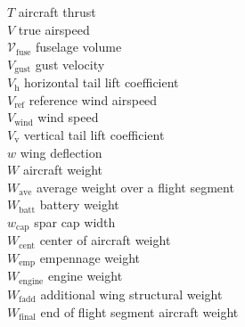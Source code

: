 \begin{multicols}{2}
\begin{tabbing}
$T$ \> aircraft thrust \\ %
$V$ \> true airspeed \\ %
$\mathcal{V}_{\text{fuse}}$ \>  fuselage volume \\ %
$V_{\text{gust}}$ \>  gust velocity \\ %
$V_{\text{h}}$ \> horizontal tail lift coefficient \\
$V_{\text{ref}}$ \>  reference wind airspeed \\ %
$V_{\text{wind}}$ \>  wind speed \\ %
$V_{\text{v}}$ \> vertical tail lift coefficient \\
$w$ \> wing deflection \\ %
$W$ \> aircraft weight \\ %
$W_{\text{ave}}$ \> average weight over a flight segment \\ %
$W_{\text{batt}}$ \> battery weight \\ %
$w_{\text{cap}}$ \> spar cap width \\ %
$W_{\text{cent}}$ \> center of aircraft weight \\ %
$W_{\text{emp}}$ \> empennage weight \\ %
$W_{\text{engine}}$ \> engine weight \\ %
$W_{\text{fadd}}$ \> additional wing structural weight\\ %
$W_{\text{final}}$ \> end of flight segment aircraft weight \\ %

\end{tabbing}
\end{multicols}
